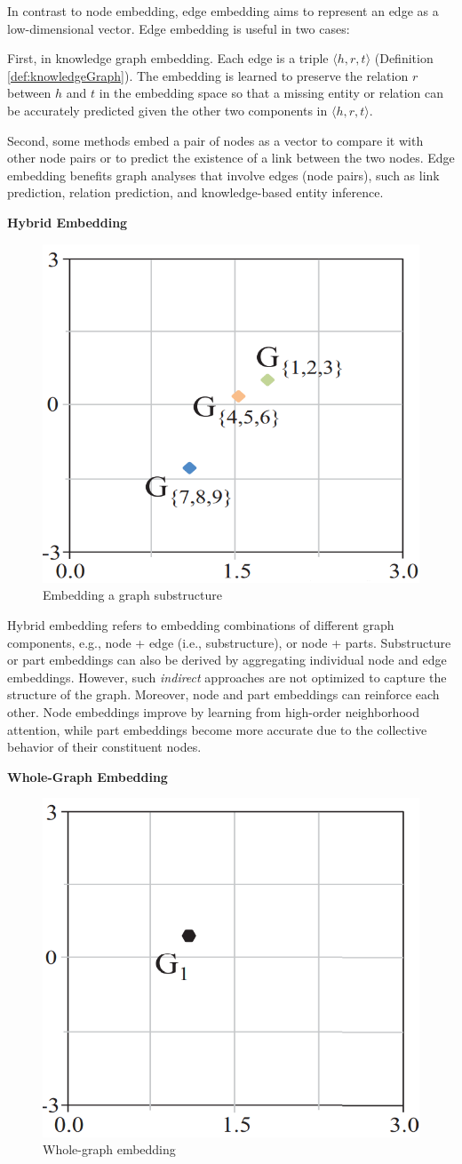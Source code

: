 In contrast to node embedding, edge embedding aims to represent an edge as a low-dimensional vector. Edge embedding is useful in two cases:

First, in knowledge graph embedding. Each edge is a triple $\langle h, r, t \rangle$ (Definition \ref{def:knowledgeGraph}). The embedding is learned to preserve the relation $r$ between $h$ and $t$ in the embedding space so that a missing entity or relation can be accurately predicted given the other two components in $\langle h, r, t \rangle$.

Second, some methods embed a pair of nodes as a vector to compare it with other node pairs or to predict the existence of a link between the two nodes. Edge embedding benefits graph analyses that involve edges (node pairs), such as link prediction, relation prediction, and knowledge-based entity inference.

\textbf{Hybrid Embedding}

\begin{figure}[htp]
	\centering
	\includegraphics[width=6 cm]{images/graph_emb_4.png}
	\caption{Embedding a graph substructure}
	\label{fig:substructureEmbedding}
\end{figure}

Hybrid embedding refers to embedding combinations of different graph components, e.g., node + edge (i.e., substructure), or node + parts. Substructure or part embeddings can also be derived by aggregating individual node and edge embeddings. However, such \textit{indirect} approaches are not optimized to capture the structure of the graph. Moreover, node and part embeddings can reinforce each other. Node embeddings improve by learning from high-order neighborhood attention, while part embeddings become more accurate due to the collective behavior of their constituent nodes.

\textbf{Whole-Graph Embedding}

\begin{figure}[htp]
	\centering
	\includegraphics[width=6 cm]{images/graph_emb_5.png}
	\caption{Whole-graph embedding}
	\label{fig:wholeGraphEmbedding}
\end{figure}

